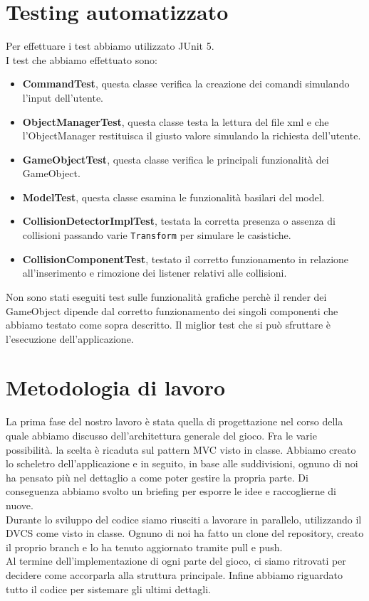 \documentclass[a4paper,12pt]{report}
\begin{document}
\section{Testing automatizzato}

Per effettuare i test abbiamo utilizzato JUnit 5.
\\I test che abbiamo effettuato sono:
\begin{itemize}
	\item \textbf{CommandTest}, questa classe verifica la creazione dei comandi simulando l'input dell'utente.
	\item \textbf{ObjectManagerTest}, questa classe testa la lettura del file xml e che l'ObjectManager restituisca il giusto valore simulando la richiesta dell'utente.
	\item \textbf{GameObjectTest}, questa classe verifica le principali funzionalità dei GameObject.
    \item \textbf{ModelTest}, questa classe esamina le funzionalità basilari del model.
    \item \textbf{CollisionDetectorImplTest}, testata la corretta presenza o assenza di collisioni passando varie \texttt{Transform} per simulare le casistiche.
    \item \textbf{CollisionComponentTest}, testato il corretto funzionamento in relazione all'inserimento e rimozione dei listener relativi alle collisioni.
\end{itemize}
Non sono stati eseguiti test sulle funzionalità grafiche perchè il render dei GameObject dipende dal corretto funzionamento dei singoli componenti che abbiamo testato come sopra descritto. Il miglior test che si può sfruttare è l'esecuzione dell'applicazione.
\newpage
\section{Metodologia di lavoro}
La prima fase del nostro lavoro è stata quella di progettazione nel corso della quale abbiamo discusso dell'architettura generale del gioco. Fra le varie possibilità. la scelta è ricaduta sul pattern MVC visto in classe.
Abbiamo creato lo scheletro dell'applicazione e in seguito, in base alle suddivisioni, ognuno di noi ha pensato più nel dettaglio a come poter gestire la propria parte. Di conseguenza abbiamo svolto un briefing per esporre le idee e raccoglierne di nuove.\\
Durante lo sviluppo del codice siamo riusciti a lavorare in parallelo, utilizzando il DVCS come visto in classe. Ognuno di noi ha fatto un clone del repository, creato il proprio branch e lo ha tenuto aggiornato tramite pull e push.\\
Al termine dell’implementazione di ogni parte del gioco, ci siamo ritrovati per decidere come accorparla alla struttura principale. Infine abbiamo riguardato tutto il codice per sistemare gli ultimi dettagli.
%
\\ \\ 
\end{document}
